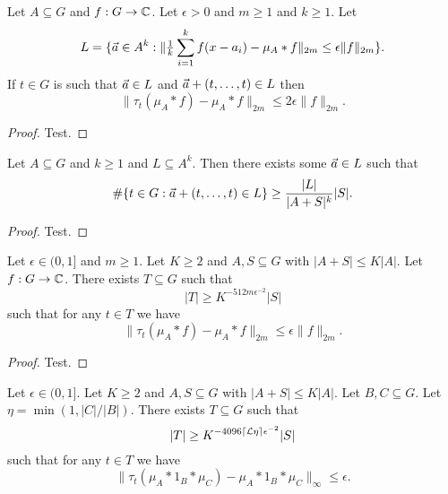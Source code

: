 \begin{lemma}
\label{aps_in_translates}
\leanok
Let $A\subseteq G$ and $f:G\to \mathbb{C}$. Let $\epsilon>0$ and $m\geq 1$ and $k\geq 1$. Let
\[L=\{ {\vec{a}}\in A^k : \|\tfrac{1}{k}\sum_{i=1}^kf(x-a_i)-\mu_A\ast f\|_{2m}\leq \epsilon \| f\|_{2m}\}.\]
If $t\in G$ is such that ${\vec{a}}\in L$ and ${\vec{a}}+(t,\ldots,t)\in L$ then
\[\| \tau_t(\mu_A\ast f)-\mu_A\ast f\|_{2m}\leq 2\epsilon \|f\|_{2m}.\]
\end{lemma}

\begin{proof}
\leanok
Test.
\end{proof}


\begin{lemma}
\label{lots_of_diagonals}
\leanok
Let $A\subseteq G$ and $k\geq 1$ and $L\subseteq A^k$. Then there exists some ${\vec{a}}\in L$ such that
\[\#\{ t\in G : {\vec{a}}+(t,\ldots,t)\in L\}\geq \frac{\lvert L\rvert}{\lvert A+S\rvert^k}\lvert S\rvert.\]
\end{lemma}

\begin{proof}
\leanok
Test.
\end{proof}


\begin{theorem}
\label{lp_ap}
\leanok
Let $\epsilon\in (0,1]$ and $m\geq 1$. Let $K\geq 2$ and $A,S\subseteq G$ with $\lvert A+S\rvert\leq K\lvert A\rvert$.
Let $f:G\to \mathbb{C}$. There exists $T\subseteq G$ such that
\[\lvert T\rvert \geq K^{-512m\epsilon^{-2}}\lvert S\rvert\]
such that for any $t\in T$ we have
\[\| \tau_t(\mu_A\ast f)-\mu_A\ast f\|_{2m}\leq \epsilon \| f\|_{2m}.\]
\end{theorem}

\begin{proof}
\leanok
Test.
\end{proof}


\begin{theorem}
\label{linfty_ap}
\leanok
Let $\epsilon\in (0,1]$. Let $K\geq 2$ and $A,S\subseteq G$ with $\lvert A+S\rvert\leq K\lvert A\rvert$.
Let $B,C\subseteq G$. Let $\eta=\min(1,\lvert C\rvert/\lvert B\rvert)$. There exists $T\subseteq G$ such that
\[\lvert T\rvert \geq K^{-4096\lceil \mathcal{L}{\eta}\rceil\epsilon^{-2}}\lvert S\rvert\]
such that for any $t\in T$ we have
\[\| \tau_t(\mu_A\ast 1_B\ast \mu_C)-\mu_A\ast 1_B\ast \mu_C\|_{\infty}\leq \epsilon.\]
\end{theorem}

